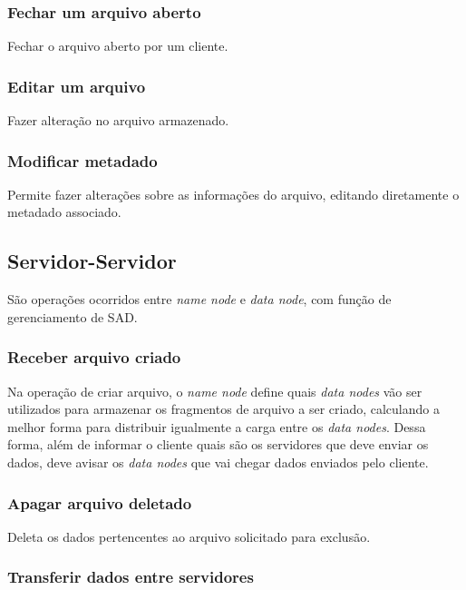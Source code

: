 	\subsubsection{Fechar um arquivo aberto}
	
	Fechar o arquivo aberto por um cliente.
	
	\subsubsection{Editar um arquivo}
	
	Fazer alteração no arquivo armazenado.
	
	\subsubsection{Modificar metadado}
	
	Permite fazer alterações sobre as informações do arquivo, editando diretamente o metadado associado.
	
	
	\subsection{Servidor-Servidor}
	São operações ocorridos entre \textit{name node} e \textit{data node}, com função de gerenciamento de SAD.
	
	\subsubsection{Receber arquivo criado}
	
	Na operação de criar arquivo, o \textit{name node} define quais \textit{data nodes} vão ser utilizados para armazenar os fragmentos de arquivo a ser criado, calculando a melhor forma para distribuir igualmente a carga entre os \textit{data nodes}. Dessa forma, além de informar o cliente quais são os servidores que deve enviar os dados, deve avisar os \textit{data nodes} que vai chegar dados enviados pelo cliente.
	
	\subsubsection{Apagar arquivo deletado}
	
	Deleta os dados pertencentes ao arquivo solicitado para exclusão.
	
	\subsubsection{Transferir dados entre servidores}
	
